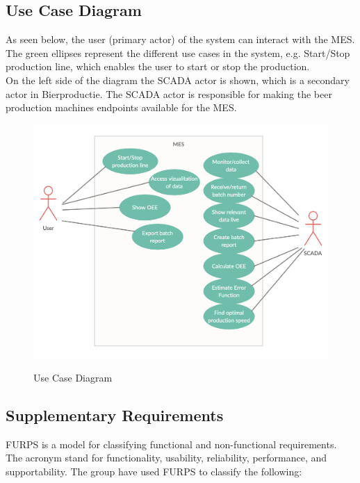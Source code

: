 \subsection{Use Case Diagram}
As seen below, the user (primary actor) of the system can interact with the MES.
The green ellipses represent the different use cases in the system, e.g.
Start/Stop production line, which enables the user to start or stop the
production. \\

On the left side of the diagram the SCADA actor is shown, which is a secondary
actor in Bierproductie. The SCADA actor is responsible for making the beer
production machines endpoints available for the MES. 

\begin{figure}[H]
\centering 
\includegraphics[scale=0.5]{images/ucdiagram.png}
\label{figure:Use_Case_Diagram}
\caption{Use Case Diagram} 
\end{figure}

\subsection{Supplementary Requirements}
FURPS is a model for classifying functional and non-functional requirements. The
acronym stand for functionality, usability, reliability, performance, and
supportability. The group have used FURPS to classify the following: 

